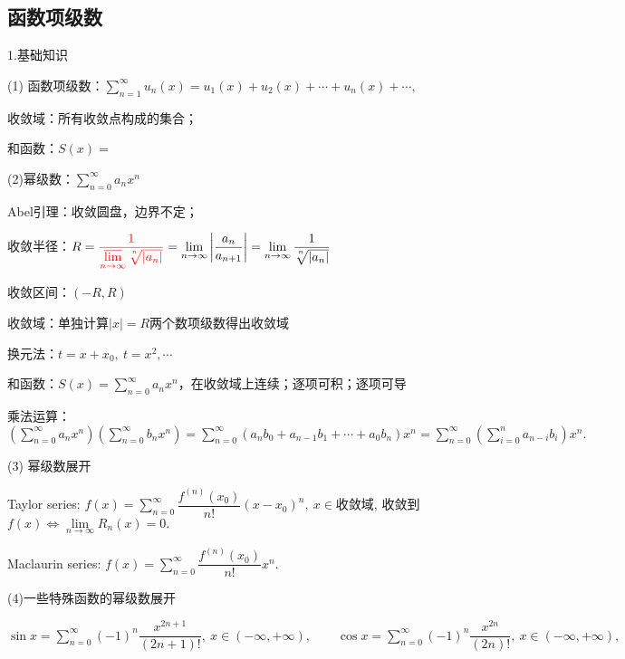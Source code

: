 \documentclass[UTF8]{ctexart}
\newcommand\no{\noindent}
\newcommand\dis{\displaystyle}
\newcommand\limn{\dis\lim\limits_{n\to\infty}}
\newcommand\sumn{\dis\sum\limits_{n=1}^{\infty}}
\newcommand\sumnz{\dis\sum\limits_{n=0}^{\infty}}
\newcommand\sumizn{\dis\sum\limits_{i=0}^{n}}
\begin{document}
\begin{spacing}{2}
\subsection{函数项级数}

\no1.基础知识

\no(1) 函数项级数：$\sumn u_n(x)=u_1(x)+u_2(x)+\cdots+u_n(x)+\cdots,\ $

\vspace{0.2cm}

收敛域：所有收敛点构成的集合；

和函数：$S(x)=$

\no(2)幂级数：$\sumnz a_nx^n$

\vspace{0.2cm}

Abel引理：收敛圆盘，边界不定；

收敛半径：$R=\textcolor[rgb]{1,0,0}{\dis\dfrac{1}{\varlimsup\limits_{n\to\infty}\sqrt[^n\!]{|a_n|}}}
=\limn\left|\dfrac{a_n}{a_{n+1}}\right|
=\limn\dfrac{1}{\sqrt[^n\!]{|a_n|}}$

\vspace{0.2cm}

收敛区间：$(-R,R)$

收敛域：单独计算$|x|=R$两个数项级数得出收敛域

换元法：$t=x+x_0,\ t=x^2,\cdots$

和函数：$S(x)=\sumnz a_nx^n$，在收敛域上连续；逐项可积；逐项可导

\vspace{0.2cm}

乘法运算：$\left(\sumnz a_nx^n\right)\left(\sumnz b_nx^n\right)
=\sumnz(a_nb_0+a_{n-1}b_1+\cdots+a_0b_n)x^n
=\sumnz\left(\sumizn a_{n-i}b_i\right)x^n.$

\vspace{0.2cm}

\no(3) 幂级数展开

Taylor series: $f(x)=\sumnz\dfrac{f^{(n)}(x_0)}{n!}(x-x_0)^n,\ x\in$收敛域, 
收敛到$f(x)\Longleftrightarrow\limn R_n(x)=0.$

\vspace{0.2cm}

Maclaurin series: $f(x)=\sumnz\dfrac{f^{(n)}(x_0)}{n!}x^n.$

\vspace{0.2cm}

\no(4)一些特殊函数的幂级数展开

\vspace{0.2cm}

$\sin x=\sumnz(-1)^n\dfrac{x^{2n+1}}{(2n+1)!},\ x\in(-\infty,+\infty),\qquad
\cos x=\sumnz (-1)^n\dfrac{x^{2n}}{(2n)!},\ x\in(-\infty,+\infty),$


\end{spacing}
\end{document}
